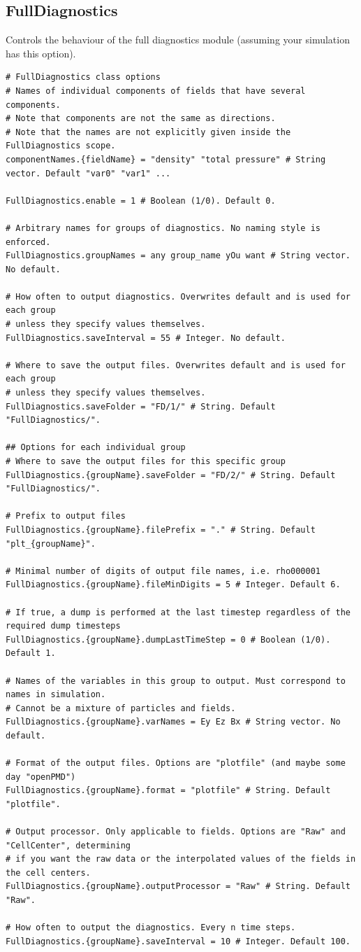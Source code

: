 \documentclass[11pt]{article}
\begin{document}
\subsection{FullDiagnostics}
Controls the behaviour of the full diagnostics module (assuming your simulation has this option).
\begin{lstlisting}[language=pkgconfig]
# FullDiagnostics class options
# Names of individual components of fields that have several components.
# Note that components are not the same as directions.
# Note that the names are not explicitly given inside the FullDiagnostics scope.
componentNames.{fieldName} = "density" "total pressure" # String vector. Default "var0" "var1" ...

FullDiagnostics.enable = 1 # Boolean (1/0). Default 0.

# Arbitrary names for groups of diagnostics. No naming style is enforced.
FullDiagnostics.groupNames = any group_name yOu want # String vector. No default.

# How often to output diagnostics. Overwrites default and is used for each group 
# unless they specify values themselves.
FullDiagnostics.saveInterval = 55 # Integer. No default.

# Where to save the output files. Overwrites default and is used for each group
# unless they specify values themselves.
FullDiagnostics.saveFolder = "FD/1/" # String. Default "FullDiagnostics/".

## Options for each individual group
# Where to save the output files for this specific group
FullDiagnostics.{groupName}.saveFolder = "FD/2/" # String. Default "FullDiagnostics/".

# Prefix to output files
FullDiagnostics.{groupName}.filePrefix = "." # String. Default "plt_{groupName}".

# Minimal number of digits of output file names, i.e. rho000001
FullDiagnostics.{groupName}.fileMinDigits = 5 # Integer. Default 6.

# If true, a dump is performed at the last timestep regardless of the required dump timesteps
FullDiagnostics.{groupName}.dumpLastTimeStep = 0 # Boolean (1/0). Default 1.

# Names of the variables in this group to output. Must correspond to names in simulation.
# Cannot be a mixture of particles and fields.
FullDiagnostics.{groupName}.varNames = Ey Ez Bx # String vector. No default.

# Format of the output files. Options are "plotfile" (and maybe some day "openPMD")
FullDiagnostics.{groupName}.format = "plotfile" # String. Default "plotfile".

# Output processor. Only applicable to fields. Options are "Raw" and "CellCenter", determining
# if you want the raw data or the interpolated values of the fields in the cell centers.
FullDiagnostics.{groupName}.outputProcessor = "Raw" # String. Default "Raw".

# How often to output the diagnostics. Every n time steps.
FullDiagnostics.{groupName}.saveInterval = 10 # Integer. Default 100.

\end{lstlisting}
\end{document}
